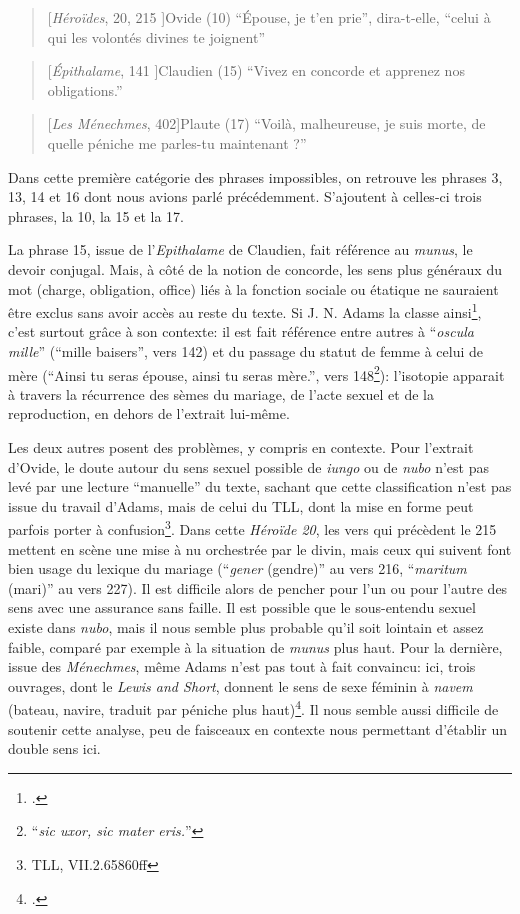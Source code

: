 \begin{quote}[\textit{Héroïdes}, 20, 215 ]{Ovide}
(10) \enquote{Épouse, je t’en prie”, dira-t-elle, “celui à qui les volontés divines te joignent}
\end{quote}

\begin{quote}[\textit{Épithalame}, 141 ]{Claudien}
(15) \enquote{Vivez en concorde et apprenez nos obligations.}
\end{quote}

\begin{quote}[\textit{Les Ménechmes}, 402]{Plaute}
(17) \enquote{Voilà, malheureuse, je suis morte, de quelle péniche me parles-tu maintenant ?}
\end{quote}

Dans cette première catégorie des phrases impossibles, on retrouve les phrases 3, 13, 14 et 16 dont nous avions parlé précédemment. S'ajoutent à celles-ci trois phrases, la 10, la 15 et la 17. 

La phrase 15, issue de l'\textit{Epithalame} de Claudien, fait référence au \textit{munus}, le devoir conjugal. Mais, à côté de la notion de concorde, les sens plus généraux du mot (charge, obligation, office) liés à la fonction sociale ou étatique ne sauraient être exclus sans avoir accès au reste du texte. Si J. N. Adams la classe ainsi\footcite[p.~161]{adams}, c'est surtout grâce à son contexte: il est fait référence entre autres à \enquote{\textit{oscula mille}} (\enquote{mille baisers}, vers 142) et du passage du statut de femme à celui de mère (\enquote{Ainsi tu seras épouse, ainsi tu seras mère.}, vers 148\footnote{\enquote{\textit{sic uxor, sic mater eris.}}}): l'isotopie apparait à travers la récurrence des sèmes du mariage, de l'acte sexuel et de la reproduction, en dehors de l'extrait lui-même. 

Les deux autres posent des problèmes, y compris en contexte. Pour l'extrait d'Ovide, le doute autour du sens sexuel possible de \textit{iungo} ou de \textit{nubo} n'est pas levé par une lecture \enquote{manuelle} du texte, sachant que cette classification n'est pas issue du travail d'Adams, mais de celui du TLL, dont la mise en forme peut parfois porter à confusion\footnote{TLL, VII.2.65860ff}. Dans cette \textit{Héroïde 20}, les vers qui précèdent le 215 mettent en scène une mise à nu orchestrée par le divin, mais ceux qui suivent font bien usage du lexique du mariage (\enquote{\textit{gener} (gendre)} au vers 216, \enquote{\textit{maritum} (mari)} au vers 227). Il est difficile alors de pencher pour l'un ou pour l'autre des sens avec une assurance sans faille. Il est possible que le sous-entendu sexuel existe dans \textit{nubo}, mais il nous semble plus probable qu'il soit lointain et assez faible, comparé par exemple à la situation de \textit{munus} plus haut. Pour la dernière, issue des \textit{Ménechmes}, même Adams n'est pas tout à fait convaincu: ici, trois ouvrages, dont le \textit{Lewis and Short}, donnent le sens de sexe féminin à \textit{navem} (bateau, navire, traduit par péniche plus haut)\footcite[p~.89, note 1]{adams}. Il nous semble aussi difficile de soutenir cette analyse, peu de faisceaux en contexte nous permettant d'établir un double sens ici.

